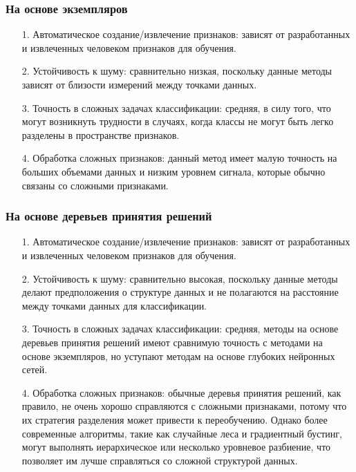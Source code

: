 \subsubsection*{На основе экземпляров}
\begin{itemize}[leftmargin=1.6\parindent]
	\item[1.] Автоматическое создание/извлечение признаков: зависят от  разработанных и извлеченных человеком признаков для обучения.
	\item[2.] Устойчивость к шуму: сравнительно низкая, поскольку данные методы  зависят от близости измерений между точками данных.
	\item[3.] Точность в сложных задачах классификации: средняя, в силу того, что могут возникнуть трудности в случаях, когда классы не могут быть легко разделены в пространстве признаков.
	\item[4.] Обработка сложных признаков: данный метод имеет малую точность на больших объемами данных и низким уровнем сигнала, которые обычно связаны со сложными признаками.
\end{itemize}

\subsubsection*{На основе деревьев принятия решений}
\begin{itemize}[leftmargin=1.6\parindent]
	\item[1.] Автоматическое создание/извлечение признаков: зависят от разработанных и извлеченных человеком признаков для обучения.
	\item[2.] Устойчивость к шуму: сравнительно высокая,  поскольку данные методы делают предположения о структуре данных и не полагаются на расстояние между точками данных для классификации.
	\item[3.] Точность в сложных задачах классификации:  средняя, методы на основе деревьев принятия решений имеют сравнимую точность с методами на основе экземпляров, но уступают методам на основе глубоких нейронных сетей.
	\item[4.] Обработка сложных признаков: обычные деревья принятия решений, как правило, не очень хорошо справляются с  сложными признаками, потому что их стратегия разделения может привести к переобучению. Однако более современные алгоритмы, такие как случайные леса и градиентный бустинг, могут выполнять иерархическое или несколько уровневое разбиение, что позволяет им лучше справляться со сложной структурой данных.
\end{itemize}


